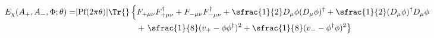 \begin{equation}\label{eq:echi}
\begin{split}
 E_\chi(A_+,A_-,\Phi;\theta)=& |\text{Pf}(2\pi\theta)|\Tr{}
 \left\{F_{+\mu\nu}F_{+\mu\nu}^\dagger
 +F_{-\mu\nu}F_{-\mu\nu}^\dagger+\sfrac{1}{2}D_\mu\phi
 (D_\mu\phi)^\dagger+\sfrac{1}{2}(D_\mu\phi)^\dagger 
 D_\mu\phi\right.\\
 &\left.\hspace*{1in}+\,\,\sfrac{1}{8}(v_+-\phi\phi^\dagger)^2
 +\sfrac{1}{8}(v_--\phi^\dagger\phi)^2\right\}
\end{split}
\end{equation} 
